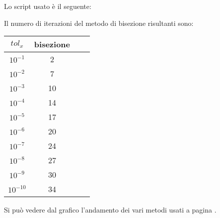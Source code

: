 \begin{flushleft}
Lo script usato è il seguente:

Il numero di iterazioni del metodo di bisezione risultanti sono:

\begin{center}
\begin{tabular}{|c|c|c|c|}
\hline
$tol_x$ & bisezione \\
\hline
$10^{-1}$ & 2 \\
$10^{-2}$ & 7 \\
$10^{-3}$ & 10 \\
$10^{-4}$ & 14 \\
$10^{-5}$ & 17 \\
$10^{-6}$ & 20 \\
$10^{-7}$ & 24 \\
$10^{-8}$ & 27 \\
$10^{-9}$ & 30 \\
$10^{-10}$ & 34 \\
\hline
\end{tabular}
\end{center}

Si può vedere dal grafico l'andamento dei vari metodi usati a pagina \pageref{fes267}.

\end{flushleft}